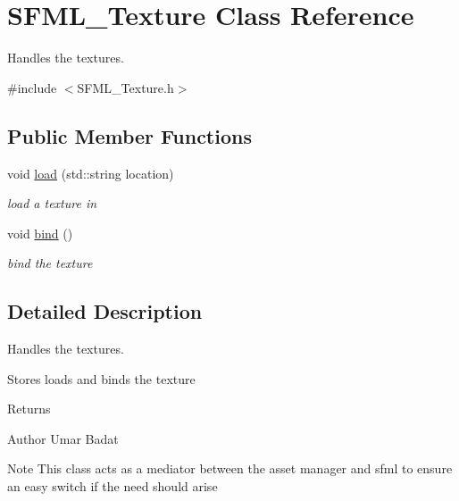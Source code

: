 \hypertarget{class_s_f_m_l___texture}{\section{S\-F\-M\-L\-\_\-\-Texture Class Reference}
\label{class_s_f_m_l___texture}
}


Handles the textures.  




{\ttfamily \#include $<$S\-F\-M\-L\-\_\-\-Texture.\-h$>$}

\subsection*{Public Member Functions}
\begin{DoxyCompactItemize}
\item 
void \hyperlink{class_s_f_m_l___texture_a08d52cde4f65b7936a8872eb1fa6e4ed}{load} (std\-::string location)
\begin{DoxyCompactList}\small\item\em load a texture in \end{DoxyCompactList}\item 
void \hyperlink{class_s_f_m_l___texture_a519376bac117252c20fdaaad0eaa9986}{bind} ()
\begin{DoxyCompactList}\small\item\em bind the texture \end{DoxyCompactList}\end{DoxyCompactItemize}


\subsection{Detailed Description}
Handles the textures. 

Stores loads and binds the texture \begin{DoxyReturn}{Returns}

\end{DoxyReturn}
\begin{DoxyAuthor}{Author}
Umar Badat 
\end{DoxyAuthor}
\begin{DoxyNote}{Note}
This class acts as a mediator between the asset manager and sfml to ensure an easy switch if the need should arise 
\end{DoxyNote}


